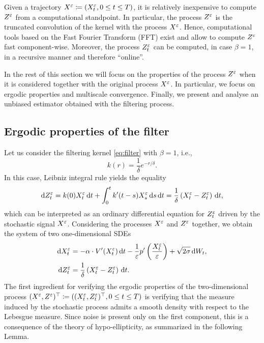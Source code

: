 \documentclass[10pt]{article}
\begin{document}
\begin{remark} Given a trajectory $X^\varepsilon \coloneqq (X^\varepsilon_t, 0\leq t \leq T)$, it is relatively inexpensive to compute $Z^\varepsilon$ from a computational standpoint. In particular, the process $Z^\varepsilon$ is the truncated convolution of the kernel with the process $X^\varepsilon$. Hence, computational tools based on the Fast Fourier Transform (FFT) exist and allow to compute $Z^\varepsilon$ fast component-wise. Moreover, the process $Z_t^\varepsilon$ can be computed, in case $\beta = 1$, in a recursive manner and therefore ``online''.
\end{remark}

In the rest of this section we will focus on the properties of the process $Z^\varepsilon$ when it is considered together with the original process $X^\varepsilon$. In particular, we focus on ergodic properties and multiscale convergence. Finally, we present and analyse an unbiased estimator obtained with the filtering process.

\subsection{Ergodic properties of the filter}\label{sec:ergodic}

Let us consider the filtering kernel \eqref{eq:filter} with $\beta = 1$, i.e.,
\begin{equation}\label{eq:filter_beta1}
	k(r) = \frac{1}{\delta} e^{-r/\delta}.
\end{equation}
In this case, Leibniz integral rule yields the equality
\begin{equation}
	\mathrm{d} Z^\varepsilon_t = k(0) X^\varepsilon_t \,\mathrm{d} t + \int_0^t k'(t-s) X^\varepsilon_s \,\mathrm{d} s \,\mathrm{d} t = \frac{1}{\delta} \left ( X^\varepsilon_t - Z^\varepsilon_t \right ) \,\mathrm{d} t,
\end{equation}
which can be interpreted as an ordinary differential equation for $Z_t^\varepsilon$ driven by the stochastic signal $X^\varepsilon$. Considering the processes $X^\varepsilon$ and $Z^\varepsilon$ together, we obtain the system of two one-dimensional SDEs
\begin{equation}
\label{eq:systemSDE}
\begin{aligned}
\mathrm{d} X_t^\varepsilon &= -\alpha \cdot V'(X_t^\varepsilon) \,\mathrm{d} t - \frac1{\varepsilon} p'\left(\frac{X_t^\varepsilon}{\varepsilon}\right) + \sqrt{2\sigma} \,\mathrm{d} W_t, \\
\mathrm{d} Z^\varepsilon_t &= \frac{1}{\delta} \left ( X^\varepsilon_t - Z^\varepsilon_t \right ) \,\mathrm{d} t.
\end{aligned}
\end{equation}
The first ingredient for verifying the ergodic properties of the two-dimensional process $(X^\varepsilon, Z^\varepsilon)^\top \coloneqq ((X^\varepsilon_t, Z^\varepsilon_t)^\top, 0 \leq t \leq T)$ is verifying that the measure induced by the stochastic process admits a smooth density with respect to the Lebesgue measure. Since noise is present only on the first component, this is a consequence of the theory of hypo-ellipticity, as summarized in the following Lemma.
\end{document}
